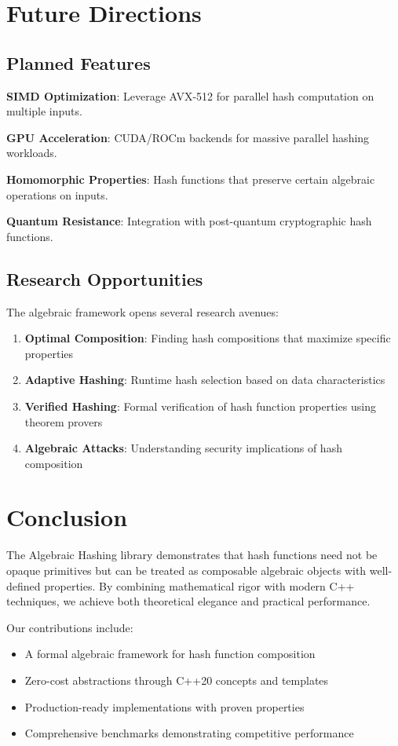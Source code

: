 \documentclass[11pt,a4paper]{article}
\theoremstyle{definition}
\begin{document}
\section{Future Directions}

\subsection{Planned Features}

\textbf{SIMD Optimization}: Leverage AVX-512 for parallel hash computation on multiple inputs.

\textbf{GPU Acceleration}: CUDA/ROCm backends for massive parallel hashing workloads.

\textbf{Homomorphic Properties}: Hash functions that preserve certain algebraic operations on inputs.

\textbf{Quantum Resistance}: Integration with post-quantum cryptographic hash functions.

\subsection{Research Opportunities}

The algebraic framework opens several research avenues:

\begin{enumerate}
    \item \textbf{Optimal Composition}: Finding hash compositions that maximize specific properties
    \item \textbf{Adaptive Hashing}: Runtime hash selection based on data characteristics
    \item \textbf{Verified Hashing}: Formal verification of hash function properties using theorem provers
    \item \textbf{Algebraic Attacks}: Understanding security implications of hash composition
\end{enumerate}

\section{Conclusion}

The Algebraic Hashing library demonstrates that hash functions need not be opaque primitives but can be treated as composable algebraic objects with well-defined properties. By combining mathematical rigor with modern C++ techniques, we achieve both theoretical elegance and practical performance.

Our contributions include:
\begin{itemize}
    \item A formal algebraic framework for hash function composition
    \item Zero-cost abstractions through C++20 concepts and templates
    \item Production-ready implementations with proven properties
    \item Comprehensive benchmarks demonstrating competitive performance
\end{itemize}
\end{document}
